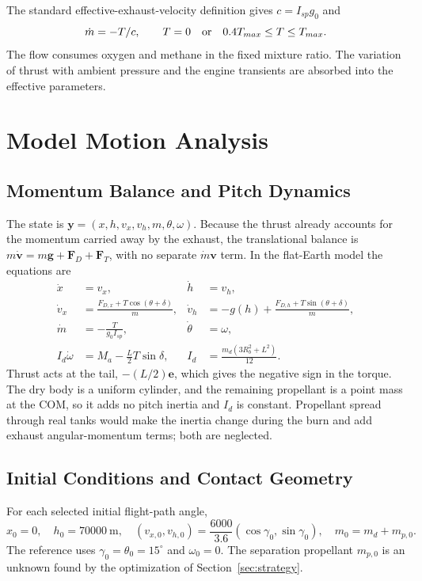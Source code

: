 The standard effective-exhaust-velocity definition gives $c=I_{sp}g_0$ and
\begin{equation}
 \dot m=-T/c,\qquad T=0\quad\hbox{or}\quad0.4T_{max}\le T\le T_{max}.
\end{equation}
The flow consumes oxygen and methane in the fixed mixture ratio. The variation of thrust with ambient pressure and the engine transients are absorbed into the effective parameters.

\section{Model Motion Analysis}
\label{sec:motion}
\subsection{Momentum Balance and Pitch Dynamics}
The state is $\mathbf y=(x,h,v_x,v_h,m,\theta,\omega)$. Because the thrust already accounts for the momentum carried away by the exhaust, the translational balance is $m\dot{\mathbf v}=m\mathbf g+\mathbf F_D+\mathbf F_T$, with no separate $\dot m\mathbf v$ term. In the flat-Earth model the equations are
\begin{align}\label{eq:dynamics}
 \dot x&=v_x,&\dot h&=v_h,\\
 \dot v_x&=\frac{F_{D,x}+T\cos(\theta+\delta)}m,&
 \dot v_h&=-g(h)+\frac{F_{D,h}+T\sin(\theta+\delta)}m,\\
 \dot m&=-\frac T{g_0I_{sp}},&\dot\theta&=\omega,\\
 I_d\dot\omega&=M_a-\frac L2T\sin\delta,&
 I_d&=\frac{m_d(3R_b^2+L^2)}{12}.
\end{align}
Thrust acts at the tail, $-(L/2)\mathbf e$, which gives the negative sign in the torque. The dry body is a uniform cylinder, and the remaining propellant is a point mass at the COM, so it adds no pitch inertia and $I_d$ is constant. Propellant spread through real tanks would make the inertia change during the burn and add exhaust angular-momentum terms; both are neglected.


\subsection{Initial Conditions and Contact Geometry}
For each selected initial flight-path angle,
\begin{equation}
 x_0=0,\quad h_0=70000\ \mathrm m,\quad
 (v_{x,0},v_{h,0})=\frac{6000}{3.6}(\cos\gamma_0,\sin\gamma_0),\quad
 m_0=m_d+m_{p,0}.
\end{equation}
The reference uses $\gamma_0=\theta_0=15^\circ$ and $\omega_0=0$. The separation propellant $m_{p,0}$ is an unknown found by the optimization of Section~\ref{sec:strategy}.

